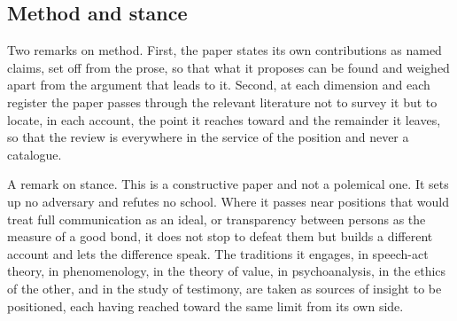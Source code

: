 \subsection*{Method and stance}

Two remarks on method. First, the paper states its own contributions as named claims, set off from the prose, so that what it proposes can be found and weighed apart from the argument that leads to it. Second, at each dimension and each register the paper passes through the relevant literature not to survey it but to locate, in each account, the point it reaches toward and the remainder it leaves, so that the review is everywhere in the service of the position and never a catalogue.

A remark on stance. This is a constructive paper and not a polemical one. It sets up no adversary and refutes no school. Where it passes near positions that would treat full communication as an ideal, or transparency between persons as the measure of a good bond, it does not stop to defeat them but builds a different account and lets the difference speak. The traditions it engages, in speech-act theory, in phenomenology, in the theory of value, in psychoanalysis, in the ethics of the other, and in the study of testimony, are taken as sources of insight to be positioned, each having reached toward the same limit from its own side.
